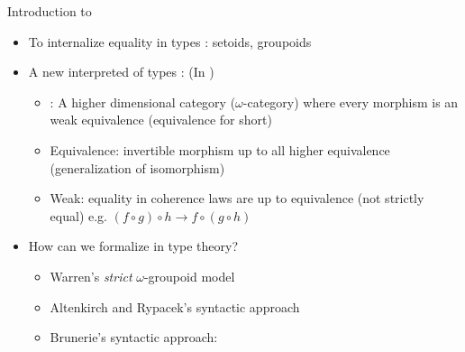 \documentclass[12pt, mathserif,handout]{beamer}
\begin{document}
\begin{frame}[allowframebreaks,t]{Introduction to \wog}

\begin{itemize}
\item To internalize equality in types : setoids, groupoids

\item A new interpreted of types : \wog (In \hott)
\begin{itemize}
\item \wogs: A higher dimensional category ($\omega$-category) where every
  morphism is an weak equivalence (equivalence for short)
\item Equivalence: invertible morphism up to all higher
  equivalence (generalization of isomorphism)
\item Weak: equality in coherence laws are up to equivalence (not
    strictly equal) e.g. $(f \circ g) \circ h \to f \circ (g \circ h)$



\end{itemize}

\item How can we formalize \wog in type theory?
\begin{itemize}
 \item Warren's \emph{strict} $\omega$-groupoid model
\item Altenkirch and Rypacek's syntactic approach
\item Brunerie's syntactic approach: \tig

\end{itemize}



\end{itemize}
\end{frame}
\end{document}
